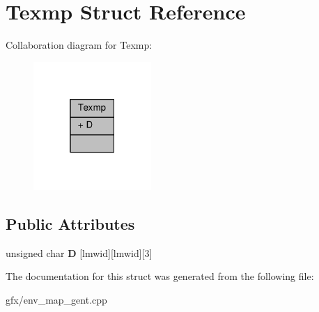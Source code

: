 \hypertarget{structTexmp}{}\section{Texmp Struct Reference}
\label{structTexmp}


Collaboration diagram for Texmp\+:
\nopagebreak
\begin{figure}[H]
\begin{center}
\leavevmode
\includegraphics[width=127pt]{dd/d1d/structTexmp__coll__graph}
\end{center}
\end{figure}
\subsection*{Public Attributes}
\begin{DoxyCompactItemize}
\item 
unsigned char {\bfseries D} \mbox{[}lmwid\mbox{]}\mbox{[}lmwid\mbox{]}\mbox{[}3\mbox{]}\hypertarget{structTexmp_a449657273863e2ab6bc2e092ad2a9d8d}{}\label{structTexmp_a449657273863e2ab6bc2e092ad2a9d8d}

\end{DoxyCompactItemize}


The documentation for this struct was generated from the following file\+:\begin{DoxyCompactItemize}
\item 
gfx/env\+\_\+map\+\_\+gent.\+cpp\end{DoxyCompactItemize}
